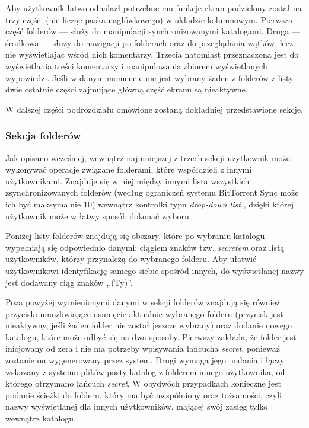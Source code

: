 Aby użytkownik łatwo odnalazł potrzebne mu funkcje ekran podzielony został na trzy części (nie licząc paska nagłówkowego) w układzie kolumnowym. Pierwsza --- część folderów --- służy do manipulacji synchronizowanymi katalogami. Druga --- środkowa --- służy do nawigacji po folderach oraz do przeglądania wątków, lecz nie wyświetlając wśród nich komentarzy. Trzecia natomiast przeznaczona jest do wyświetlania treści komentarzy i manipulowania zbiorem wyświetlanych wypowiedzi. Jeśli w danym momencie nie jest wybrany żaden z folderów z listy, dwie ostatnie części zajmujące główną część ekranu są nieaktywne.

W dalszej części podrozdziału omówione zostaną dokładniej przedstawione sekcje.

\subsubsection*{Sekcja folderów}

Jak opisano wcześniej, wewnątrz najmniejszej z trzech sekcji użytkownik może wykonywać operacje związane folderami, które współdzieli z innymi użytkownikami. Znajduje się w niej między innymi lista wszystkich zsynchronizowanych folderów (według ograniczeń systemu BitTorrent Sync może ich być maksymalnie $10$) wewnątrz kontrolki typu \emph{drop-down list} \cite{dropdownlist}, dzięki której użytkownik może w łatwy sposób dokonać wyboru.

Poniżej listy folderów znajdują się obszary, które po wybraniu katalogu wypełniają się odpowiednio danymi: ciągiem znaków tzw. \emph{secretem} oraz listą użytkowników, którzy przynależą do wybranego folderu. Aby ułatwić użytkownikowi identyfikację samego siebie spośród innych, do wyświetlanej nazwy jest dodawany ciąg znaków ,,(Ty)''.

Poza powyżej wymienionymi danymi w sekcji folderów znajdują się również przyciski umożliwiające usunięcie aktualnie wybranego folderu (przycisk jest nieaktywny, jeśli żaden folder nie został jeszcze wybrany) oraz dodanie nowego katalogu, które może odbyć się na dwa sposoby. Pierwszy zakłada, że folder jest inicjowany od zera i nie ma potrzeby wpisywania łańcucha \emph{secret}, ponieważ zostanie on wygenerowany przez system. Drugi wymaga jego podania i łączy wskazany z systemu plików pusty katalog z folderem innego użytkownika, od którego otrzymano łańcuch \emph{secret}. W obydwóch przypadkach konieczne jest podanie ścieżki do folderu, który ma być uwspólniony oraz tożsamości, czyli nazwy wyświetlanej dla innych użytkowników, mającej swój zasięg tylko wewnątrz katalogu.

